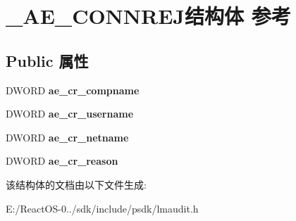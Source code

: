 \hypertarget{struct___a_e___c_o_n_n_r_e_j}{}\section{\+\_\+\+A\+E\+\_\+\+C\+O\+N\+N\+R\+E\+J结构体 参考}
\label{struct___a_e___c_o_n_n_r_e_j}
\subsection*{Public 属性}
\begin{DoxyCompactItemize}
\item 
\mbox{\label{struct___a_e___c_o_n_n_r_e_j_a930e369e6db552af6c1c47f7efe3b384}} 
D\+W\+O\+RD {\bfseries ae\+\_\+cr\+\_\+compname}
\item 
\mbox{\label{struct___a_e___c_o_n_n_r_e_j_a91c8a68ab0a03e4bfa5062a93a77d631}} 
D\+W\+O\+RD {\bfseries ae\+\_\+cr\+\_\+username}
\item 
\mbox{\label{struct___a_e___c_o_n_n_r_e_j_ae5024a4b5f69114b6536457664b08198}} 
D\+W\+O\+RD {\bfseries ae\+\_\+cr\+\_\+netname}
\item 
\mbox{\label{struct___a_e___c_o_n_n_r_e_j_ab5d22f8962bb13f990384bff6b96b57a}} 
D\+W\+O\+RD {\bfseries ae\+\_\+cr\+\_\+reason}
\end{DoxyCompactItemize}


该结构体的文档由以下文件生成\+:\begin{DoxyCompactItemize}
\item 
E\+:/\+React\+O\+S-\/0../sdk/include/psdk/lmaudit.\+h\end{DoxyCompactItemize}
